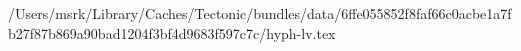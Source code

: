 /Users/msrk/Library/Caches/Tectonic/bundles/data/6ffe055852f8faf66c0acbe1a7fb27f87b869a90bad1204f3bf4d9683f597c7c/hyph-lv.tex